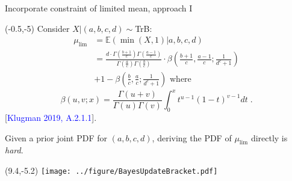 \documentclass[aspectratio=169]{beamer}
\begin{document}
%
%
%
%
%
%
%



\begin{frame}{Incorporate constraint of limited mean, approach I}
\begin{textblock}{9}(-0.5,-5)
Consider $X|(a, b, c, d)\sim$TrB:
\begin{equation*}
\begin{split}
\mu_{\text{lim}}& = \mathbb{E}(\min(X, 1)|a, b, c, d)\\
&= \frac{ d \cdot  \Gamma\left(  \frac{b + 1}{c}  \right)\Gamma\left(   \frac{a-1}{c} \right)  }{\Gamma\left(    \frac{a}{c}  \right) \Gamma\left( \frac{b}{c} \right) }\cdot \beta \left( \frac{b+1}{c}  ,  \frac{a-1}{c} ;   \frac{1}{d^c+1}  \right)\\
&+1 - \beta \left( \frac{b}{c} , \frac{a}{c} ; \frac{1}{d^c+1} \right)\text{ where}
\end{split}
\end{equation*}
\begin{equation*}
\beta(u, v; x) =  \frac{\Gamma(u + v)}{ \Gamma(u)\Gamma(v) }\int_{0}^{x} t^{u-1}(1-t)^{v-1}dt\;.
\end{equation*}
[\textcolor{blue}{Klugman 2019, A.2.1.1}].\bigskip

Given a prior joint PDF for $(a, b, c, d)$, deriving the PDF of $\mu_{\text{lim}}$ directly is \textit{hard}.
\end{textblock}

\begin{textblock}{1}(9.4,-5.2)
\texttt{[image: ../figure/BayesUpdateBracket.pdf]}
\end{textblock}

\end{frame}
\end{document}
